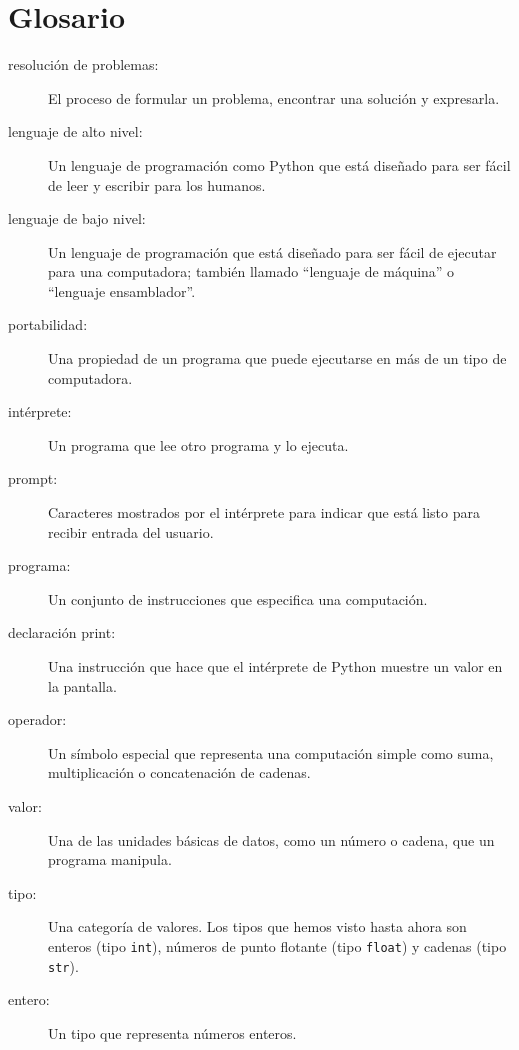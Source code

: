 \section{Glosario}

\begin{description}
\item[resolución de problemas:] El proceso de formular un problema, encontrar una solución y expresarla.

\item[lenguaje de alto nivel:] Un lenguaje de programación como Python que está diseñado para ser fácil de leer y escribir para los humanos.

\item[lenguaje de bajo nivel:] Un lenguaje de programación que está diseñado para ser fácil de ejecutar para una computadora; también llamado ``lenguaje de máquina'' o ``lenguaje ensamblador''.

\item[portabilidad:] Una propiedad de un programa que puede ejecutarse en más de un tipo de computadora.

\item[intérprete:] Un programa que lee otro programa y lo ejecuta.

\item[prompt:] Caracteres mostrados por el intérprete para indicar que está listo para recibir entrada del usuario.

\item[programa:] Un conjunto de instrucciones que especifica una computación.

\item[declaración print:] Una instrucción que hace que el intérprete de Python muestre un valor en la pantalla.

\item[operador:] Un símbolo especial que representa una computación simple como suma, multiplicación o concatenación de cadenas.

\item[valor:] Una de las unidades básicas de datos, como un número o cadena, que un programa manipula.

\item[tipo:] Una categoría de valores. Los tipos que hemos visto hasta ahora son enteros (tipo \texttt{int}), números de punto flotante (tipo \texttt{float}) y cadenas (tipo \texttt{str}).

\item[entero:] Un tipo que representa números enteros.


\end{description}
